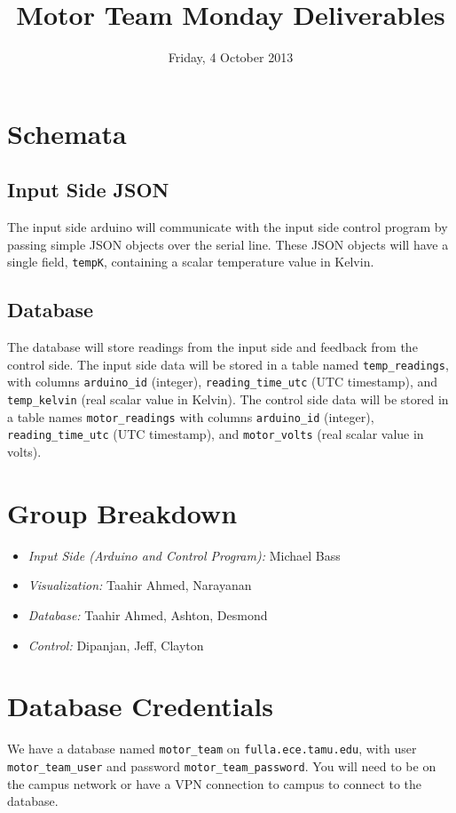 \documentclass{article}
\title{Motor Team Monday Deliverables}
\date{Friday, 4 October 2013}
\begin{document}
\maketitle

\section{Schemata}
\subsection{Input Side JSON}
The input side arduino will communicate with the input side control program by
passing simple JSON objects over the serial line.  These JSON objects will have
a single field, \texttt{tempK}, containing a scalar temperature value in Kelvin.

\subsection{Database}
The database will store readings from the input side and feedback from the
control side.  The input side data will be stored in a table named
\texttt{temp\_readings}, with columns \texttt{arduino\_id} (integer),
\texttt{reading\_time\_utc} (UTC timestamp), and \texttt{temp\_kelvin} (real
scalar value in Kelvin).  The control side data will be stored in a table names
\texttt{motor\_readings} with columns \texttt{arduino\_id} (integer),
\texttt{reading\_time\_utc} (UTC timestamp), and \texttt{motor\_volts} (real
scalar value in volts).

\section{Group Breakdown}
\begin{itemize}
  \item \emph{Input Side (Arduino and Control Program):} Michael Bass
  \item \emph{Visualization:} Taahir Ahmed, Narayanan
  \item \emph{Database:} Taahir Ahmed, Ashton, Desmond
  \item \emph{Control:} Dipanjan, Jeff, Clayton
\end{itemize}

\section{Database Credentials}
We have a database named \texttt{motor\_team} on \texttt{fulla.ece.tamu.edu}, with
user \texttt{motor\_team\_user} and password \texttt{motor\_team\_password}.
You will need to be on the campus network or have a VPN connection to campus to
connect to the database.
\end{document}
